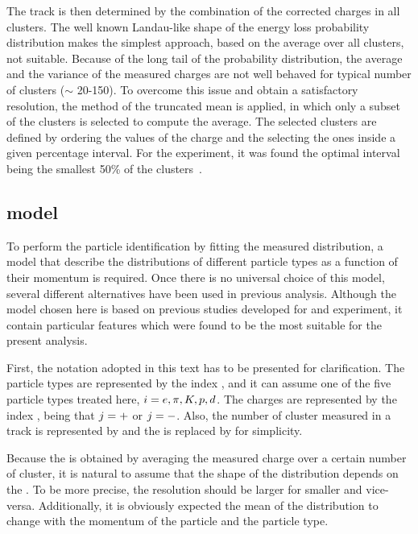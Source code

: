 The track \dedx is then determined by the combination of the corrected 
charges in all clusters. The well known Landau-like shape of the
energy loss probability distribution makes the simplest approach,
based on the average over all clusters, not suitable. Because of the
long tail of the probability distribution, the average and the variance
of the measured charges are not well behaved for typical number of clusters
($\sim$ 20-150). To overcome this issue and obtain a satisfactory \dedx resolution,
the method of the truncated mean is applied, in which only a subset of the clusters
is selected to compute the average. The selected clusters are defined by ordering
the values of the charge and the selecting the ones inside a given percentage interval.
For the \NASixtyOne experiment, it was found the optimal interval being the smallest 50\%
of the clusters~\cite{GaborVeresThesis}.


\subsection{\dedx model}


To perform the particle identification by fitting the
measured \dedx distribution, a model that describe
the \dedx distributions of different particle types as a function
of their momentum \p is required. Once there is no universal choice
of this model, several different alternatives have been
used in previous analysis. Although the model chosen here 
is based on previous studies developed for
\NAFortyNine and \NASixtyOne experiment, it contain
particular features which were found to be the most suitable
for the present analysis.

First, the notation adopted in this text has to be presented
for clarification. The particle types are represented by
the index \ipart, and it can assume one of the five particle types
treated here, $i=e, \pi, K, p, d$. The charges are represented by
the index \ich, being that $j = +$ or $j=-$. Also, the number of
cluster measured in a track is represented by \ncl and the \dedx
is replaced by \eps for simplicity.

Because the \dedx is obtained by averaging the measured charge
over a certain number of cluster, it is natural to assume that
the shape of the \eps distribution depends on the \ncl.
To be more precise, the \eps resolution should be 
larger for smaller \ncl and vice-versa. 
Additionally, it is obviously expected the mean of the distribution
to change with the momentum of the particle \p and the particle type.


